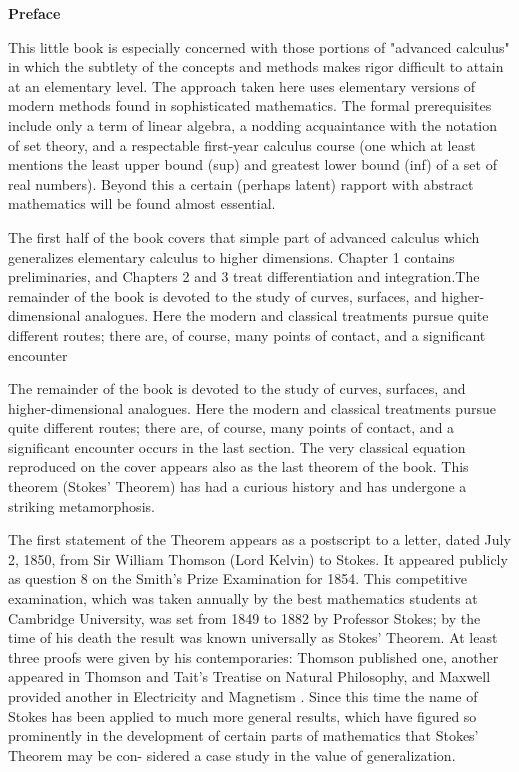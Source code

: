 \thispagestyle{empty}
\vspace*{4em}
\begin{center}
    {\bfseries\Huge Preface}
    \label{Preface}
\end{center}
\vspace*{5em}
This little book is especially concerned with those portions of
"advanced calculus" in which the subtlety of the concepts and
methods makes rigor difficult to attain at an elementary level.
The approach taken here uses elementary versions of modern
methods found in sophisticated mathematics. The formal
prerequisites include only a term of linear algebra, a nodding
acquaintance with the notation of set theory, and a respectable
first-year calculus course (one which at least mentions the
least upper bound (sup) and greatest lower bound (inf) of a
set of real numbers). Beyond this a certain (perhaps latent)
rapport with abstract mathematics will be found almost
essential.

The first half of the book covers that simple part of advanced 
calculus which generalizes elementary calculus to higher dimensions.
Chapter 1 contains preliminaries, and Chapters 2 and 3 treat 
differentiation and integration.The remainder of the book is devoted 
to the study of curves, surfaces, and higher-dimensional analogues.
Here the modern and classical treatments pursue quite different routes; 
there are, of course, many points of contact, and a significant encounter

The remainder of the book is devoted to the study of curves,
surfaces, and higher-dimensional analogues. Here the modern and classical 
treatments pursue quite different routes; there are, of course, 
many points of contact, and a significant encounter occurs 
in the last section. The very classical equation reproduced 
on the cover appears also as the last theorem of the
book. This theorem (Stokes' Theorem) has had a curious
history and has undergone a striking metamorphosis.

The first statement of the Theorem appears as a postscript
to a letter, dated July 2, 1850, from Sir William Thomson
(Lord Kelvin) to Stokes. It appeared publicly as question 8
on the Smith's Prize Examination for 1854.
This competitive examination, which was taken annually by the best 
mathematics students at Cambridge University, was set from 1849 to
1882 by Professor Stokes; by the time of his death the result
was known universally as Stokes' Theorem. At least three
proofs were given by his contemporaries: Thomson published
one, another appeared in Thomson and Tait's Treatise on
Natural Philosophy, and Maxwell provided another in Electricity 
and Magnetism \cite{maxwell1954electricity}. Since this time the name of
Stokes has been applied to much more general results, which
have figured so prominently in the development of certain
parts of mathematics that Stokes' Theorem may be con-
sidered a case study in the value of generalization.

